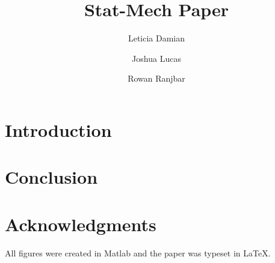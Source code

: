 \documentclass[prl,twocolumn]{revtex4-1}  %
\begin{document}

\title{ Stat-Mech Paper }
\author{Leticia Damian }
\author{Joshua Lucas}
\author{Rowan Ranjbar}







\begin{abstract}

\end{abstract}
 

\maketitle %

\section{Introduction}

\lipsum






\clearpage
\section{Conclusion}
\lipsum
\appendix*   %


\section{ Acknowledgments}

 All figures were created in Matlab and the paper was typeset in \LaTeX.
\begin{acknowledgments}


\end{acknowledgments}
\end{document}
